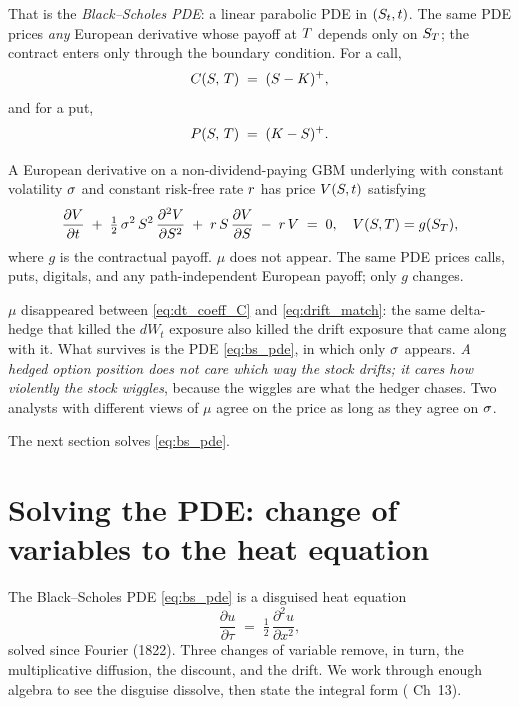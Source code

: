 That is the \emph{Black--Scholes PDE}: a linear parabolic PDE in
$(S_t, t)$. The same PDE prices \emph{any} European derivative
whose payoff at $T$ depends only on $S_T$; the contract
enters only through the boundary condition. For a call,
\begin{equation}
  C(S,\,T) \;=\; (S - K)^+,
  \label{eq:bs_bc_call}
\end{equation}
and for a put,
\begin{equation}
  P(S,\,T) \;=\; (K - S)^+.
  \label{eq:bs_bc_put}
\end{equation}

\begin{keyfactbox}
A European derivative on a non-dividend-paying GBM underlying
with constant volatility $\sigma$ and constant risk-free rate
$r$ has price $V(S, t)$ satisfying
\[
  \frac{\partial V}{\partial t}
  \;+\; \tfrac{1}{2}\,\sigma^2\,S^2\,
        \frac{\partial^2 V}{\partial S^2}
  \;+\; r\,S\,\frac{\partial V}{\partial S}
  \;-\; r\,V
  \;=\; 0,
  \quad
  V(S, T) = g(S_T),
\]
where $g$ is the contractual payoff. $\mu$ does not appear. The
same PDE prices calls, puts, digitals, and any path-independent
European payoff; only $g$ changes.
\end{keyfactbox}

\begin{intuitionbox}
$\mu$ disappeared between \eqref{eq:dt_coeff_C} and
\eqref{eq:drift_match}: the same delta-hedge that killed the
$dW_t$ exposure also killed the drift exposure that came along
with it. What survives is the PDE \eqref{eq:bs_pde}, in which
only $\sigma$ appears. \emph{A hedged option position does not
care which way the stock drifts; it cares how violently the
stock wiggles}, because the wiggles are what the hedger chases.
Two analysts with different views of $\mu$ agree on the price as
long as they agree on $\sigma$.
\end{intuitionbox}

The next section solves \eqref{eq:bs_pde}.

\section{Solving the PDE: change of variables to the heat equation}
\label{sec:ch15_solving}

The Black--Scholes PDE \eqref{eq:bs_pde} is a disguised heat
equation
\begin{equation}
  \frac{\partial u}{\partial \tau}
  \;=\; \tfrac{1}{2}\,\frac{\partial^2 u}{\partial x^2},
  \label{eq:heat}
\end{equation}
solved since Fourier (1822). Three changes of variable remove,
in turn, the multiplicative diffusion, the discount, and the
drift. We work through enough algebra to see the disguise
dissolve, then state the integral form (\citeHull{} Ch~13).

